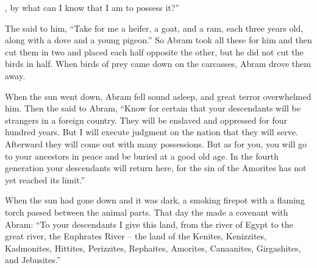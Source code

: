 {{}, by what
can I know
that
I am
to possess it?”
\par }{\PP {}The
{} said
to him,
“Take
for me a heifer,
a goat,
and a ram,
each three years old,
along with a dove
and a young pigeon.”
So Abram took
all
these
for him and then cut
them in two
and placed
each
half
opposite
the other,
but he did not
cut the birds
in half.
When birds of prey
came down
on
the carcasses,
Abram drove them away.
\par }{\PP {}When
the sun
went down,
Abram
fell
sound asleep,
and great
terror
overwhelmed
him.
Then the
{} said
to Abram,
“Know
for
certain
that your descendants
will be
strangers in a foreign
country.
They will be enslaved
and oppressed
for four
hundred
years.
But I
will execute judgment on
the nation
that
they will serve.
Afterward
they will come out
with many possessions.
But as for you,
you will go
to
your ancestors
in peace
and be buried
at a good
old age.
In the fourth
generation
your descendants will return
here,
for
the sin
of the Amorites
has not
yet
reached its limit.”
\par }{\PP {}When
the sun
had gone
down and it was
dark,
a smoking
firepot
with a flaming
torch
passed
between
the animal parts.
That
day
the {}
made
a covenant
with
Abram: “To your descendants
I give
this
land,
from the river
of Egypt
to
the great
river,
the Euphrates
River –
the land of the Kenites,
Kenizzites,
Kadmonites,
Hittites,
Perizzites,
Rephaites,
Amorites,
Canaanites,
Girgashites,
and Jebusites.”

}
